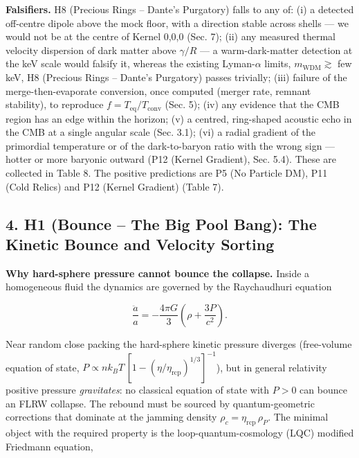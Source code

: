 \documentclass[
  11pt,
]{article}
\begin{document}
\textbf{Falsifiers.} H8 (Precious Rings -- Dante's Purgatory) falls to
any of: (i) a detected off-centre dipole above the mock floor, with a
direction stable across shells --- we would not be at the centre of
Kernel 0,0,0 (Sec. 7); (ii) any measured thermal velocity dispersion of
dark matter above \(\gamma/R\) --- a warm-dark-matter detection at the
keV scale would falsify it, whereas the existing Lyman-\(\alpha\)
limits, \(m_{\text{WDM}} \gtrsim\) few keV, H8 (Precious Rings --
Dante's Purgatory) passes trivially; (iii) failure of the
merge-then-evaporate conversion, once computed (merger rate, remnant
stability), to reproduce \(f = T_{\text{eq}}/T_{\text{conv}}\) (Sec. 5);
(iv) any evidence that the CMB region has an edge within the horizon;
(v) a centred, ring-shaped acoustic echo in the CMB at a single angular
scale (Sec. 3.1); (vi) a radial gradient of the primordial temperature
or of the dark-to-baryon ratio with the wrong sign --- hotter or more
baryonic outward (P12 (Kernel Gradient), Sec. 5.4). These are collected
in Table 8. The positive predictions are P5 (No Particle DM), P11 (Cold
Relics) and P12 (Kernel Gradient) (Table 7).

\hypertarget{h1-bounce-the-big-pool-bang-the-kinetic-bounce-and-velocity-sorting}{%
\subsection{\texorpdfstring{\textbf{4. H1 (Bounce -- The Big Pool Bang):
The Kinetic Bounce and Velocity
Sorting}}{4. H1 (Bounce -- The Big Pool Bang): The Kinetic Bounce and Velocity Sorting}}\label{h1-bounce-the-big-pool-bang-the-kinetic-bounce-and-velocity-sorting}}

\textbf{Why hard-sphere pressure cannot bounce the collapse.} Inside a
homogeneous fluid the dynamics are governed by the Raychaudhuri equation

\[\frac{\ddot{a}}{a} = -\frac{4\pi G}{3} \left( \rho + \frac{3P}{c^2} \right).\]

Near random close packing the hard-sphere kinetic pressure diverges
(free-volume equation of state,
\(P \propto n k_B T\,[1 - (\eta/\eta_{\text{rcp}})^{1/3}]^{-1}\)), but
in general relativity positive pressure \emph{gravitates}: no classical
equation of state with \(P > 0\) can bounce an FLRW collapse. The
rebound must be sourced by quantum-geometric corrections that dominate
at the jamming density \(\rho_c = \eta_{\text{rcp}}\,\rho_P\). The
minimal object with the required property is the loop-quantum-cosmology
(LQC) modified Friedmann equation,
\end{document}
